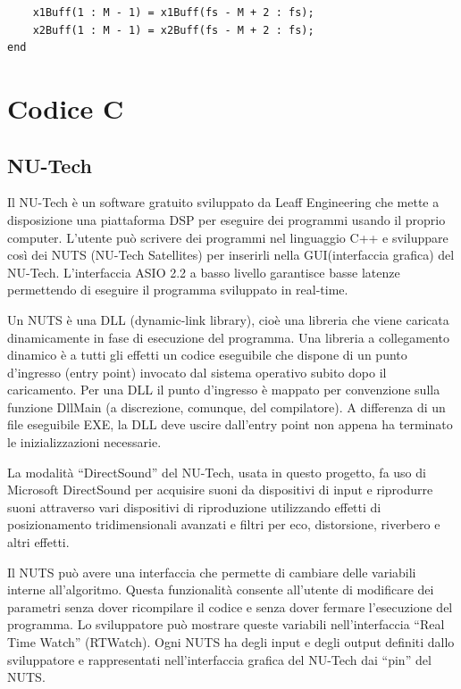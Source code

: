 \documentclass[12pt,a4paper,titlepage]{article}
\begin{document}
\begin{lstlisting}[label=code:ols6, caption=Aggiornamento del buffer di ingresso, captionpos=b, language=matlabfloz]
    % first M - 1 values of the new vector must be the last ones of the previous array
    x1Buff(1 : M - 1) = x1Buff(fs - M + 2 : fs); 
    x2Buff(1 : M - 1) = x2Buff(fs - M + 2 : fs); 
end
\end{lstlisting}  

\clearpage

\section{Codice C}
\label{sec:codice_c}
\subsection{NU-Tech}
\label{subsec:NUTech}
Il NU-Tech è un software gratuito sviluppato da Leaff Engineering che mette a disposizione una piattaforma DSP per eseguire dei programmi usando il proprio computer. L'utente può scrivere dei programmi nel linguaggio C++ e sviluppare così dei NUTS (NU-Tech Satellites) per inserirli nella GUI(interfaccia grafica) del NU-Tech. L'interfaccia ASIO 2.2 a basso livello garantisce basse latenze permettendo di eseguire il programma sviluppato in real-time.

Un NUTS è una DLL (dynamic-link library), cioè una libreria che viene caricata dinamicamente in fase di esecuzione del programma. Una libreria a collegamento dinamico è a tutti gli effetti un codice eseguibile che dispone di un punto d'ingresso (entry point) invocato dal sistema operativo subito dopo il caricamento. Per una DLL il punto d'ingresso è mappato per convenzione sulla funzione DllMain (a discrezione, comunque, del compilatore). A differenza di un file eseguibile EXE, la DLL deve uscire dall'entry point non appena ha terminato le inizializzazioni necessarie.

La modalità ``DirectSound'' del NU-Tech, usata in questo progetto, fa uso di Microsoft DirectSound per acquisire suoni da dispositivi di input e riprodurre suoni attraverso vari dispositivi di riproduzione utilizzando effetti di posizionamento tridimensionali avanzati e filtri per eco, distorsione, riverbero e altri effetti. 

Il NUTS può avere una interfaccia che permette di cambiare delle variabili interne all'algoritmo. Questa funzionalità consente all'utente di modificare dei parametri senza dover ricompilare il codice e senza dover fermare l'esecuzione del programma. Lo sviluppatore può mostrare queste variabili nell'interfaccia ``Real Time Watch'' (RTWatch). Ogni NUTS ha degli input e degli output definiti dallo sviluppatore e rappresentati nell'interfaccia grafica del NU-Tech dai ``pin'' del NUTS.
\end{document}
